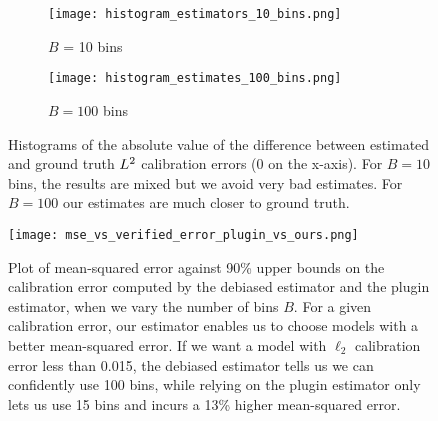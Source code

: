 
\begin{figure}
  \centering
  \centering
     \begin{subfigure}[b]{0.45\textwidth}
         \centering
         \texttt{[image: histogram\_estimators\_10\_bins.png]}
         \caption{$B$ = 10 bins}
     \end{subfigure}
     \hfill
     \begin{subfigure}[b]{0.45\textwidth}
         \centering
         \texttt{[image: histogram\_estimates\_100\_bins.png]}
         \caption{$B = 100$ bins}
     \end{subfigure}
  \caption{Histograms of the absolute value of the difference between estimated and ground truth $L^2$ calibration errors ($0$ on the x-axis). For $B = 10$ bins, the results are mixed but we avoid very bad estimates. For $B=100$ our estimates are much closer to ground truth.}
  \label{fig:histograms_estimators_bins}
\end{figure}

\begin{figure}
  \centering
  \texttt{[image: mse\_vs\_verified\_error\_plugin\_vs\_ours.png]}
  \caption{Plot of mean-squared error against 90\% upper bounds on the calibration error computed by the debiased estimator and the plugin estimator, when we vary the number of bins $B$. For a given calibration error, our estimator enables us to choose models with a better mean-squared error. If we want a model with $\ell_2$ calibration error less than 0.015, the debiased estimator tells us we can confidently use 100 bins, while relying on the plugin estimator only lets us use 15 bins and incurs a 13\% higher mean-squared error.}
  \label{fig:mse_vs_ce_estimator}
\end{figure}

